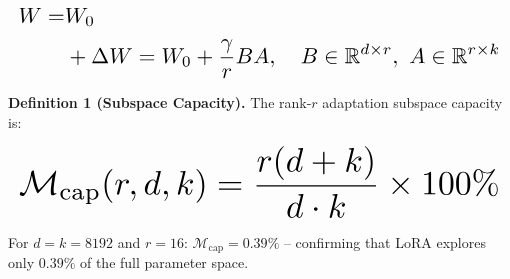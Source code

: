 \documentclass[10pt,journal,compsoc,twocolumn]{IEEEtran}
\begin{document}
\begin{equation}
\resizebox{\columnwidth}{!}{$\displaystyle
\begin{aligned}
W = & W_0 \\
& + \Delta W = W_0 + \frac{\gamma}{r}BA, \quad B \in \mathbb{R}^{d \times r},\ A \in \mathbb{R}^{r \times k}
\end{aligned}
$}
\end{equation}

























\textbf{Definition 1 (Subspace Capacity).} The rank-$r$ adaptation subspace capacity is:

























\begin{equation}
\resizebox{\columnwidth}{!}{$\displaystyle
\begin{aligned}
\mathcal{M}_{\text{cap}}(r, d, k) = \frac{r(d + k)}{d \cdot k} \times 100\%
\end{aligned}
$}
\end{equation}

























For $d = k = 8192$ and $r = 16$: $\mathcal{M}_{\text{cap}} = 0.39\%$ -- confirming that LoRA explores only $0.39\%$ of the full parameter space.
\end{document}
